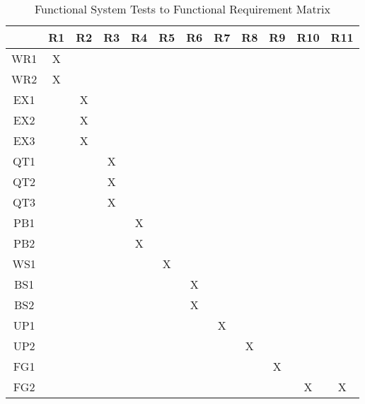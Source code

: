 \documentclass[12pt, titlepage]{article}
\begin{document}
	\begin{table}[h!]
		\centering
		\begin{tabular}{|c|c|c|c|c|c|c|c|c|c|c|c|}
			\hline
			& R1 & R2 & R3 & R4 & R5 & R6 & R7 & R8 & R9 & R10 & R11 \\ \hline
			WR1 &X & & & & & & & & & & \\ \hline
			WR2 &X & & & & & & & & & & \\ \hline
			EX1 & &X & & & & & & & & & \\ \hline 
			EX2 & &X & & & & & & & & & \\ \hline
			EX3 & &X & & & & & & & & &\\ \hline 
			QT1 & & &X & & & & & & & & \\ \hline 
			QT2 & & &X & & & & & & & & \\ \hline 
			QT3 & & &X & & & & & & & & \\ \hline 
			PB1 & & & &X & & & & & & & \\ \hline 
			PB2 & & & &X & & & & & & & \\ \hline 
			WS1 & & & & &X & & & & & & \\ \hline 
			BS1 & & & & & &X & & & & & \\ \hline 
			BS2 & & & & & &X & & & & & \\ \hline 
			UP1 & & & & & & &X & & & & \\ \hline 
			UP2 & & & & & & & &X & & & \\ \hline 
			FG1 & & & & & & & & &X & & \\ \hline 
			FG2 & & & & & & & & & &X &X \\ \hline 	
		\end{tabular}
		\caption{Functional System Tests to Functional Requirement Matrix}
		\label{Table:R_trace}
	\end{table}
\end{document}
